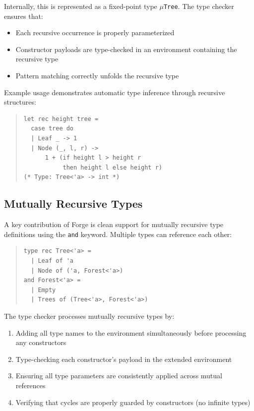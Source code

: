 \documentclass[conference,onecolumn]{IEEEtran}
\begin{document}
Internally, this is represented as a fixed-point type $\mu$\texttt{Tree}. The type checker ensures that:
\begin{itemize}
\item Each recursive occurrence is properly parameterized
\item Constructor payloads are type-checked in an environment containing the recursive type
\item Pattern matching correctly unfolds the recursive type
\end{itemize}

Example usage demonstrates automatic type inference through recursive structures:

\begin{quote}
\small
\begin{verbatim}
let rec height tree =
  case tree do
  | Leaf _ -> 1
  | Node (_, l, r) -> 
      1 + (if height l > height r 
           then height l else height r)
(* Type: Tree<'a> -> int *)
\end{verbatim}
\end{quote}

\subsection{Mutually Recursive Types}

A key contribution of Forge is clean support for mutually recursive type definitions using the \texttt{and} keyword. Multiple types can reference each other:

\begin{quote}
\small
\begin{verbatim}
type rec Tree<'a> = 
  | Leaf of 'a 
  | Node of ('a, Forest<'a>)
and Forest<'a> = 
  | Empty 
  | Trees of (Tree<'a>, Forest<'a>)
\end{verbatim}
\end{quote}

The type checker processes mutually recursive types by:
\begin{enumerate}
\item Adding all type names to the environment simultaneously before processing any constructors
\item Type-checking each constructor's payload in the extended environment
\item Ensuring all type parameters are consistently applied across mutual references
\item Verifying that cycles are properly guarded by constructors (no infinite types)
\end{enumerate}
\end{document}
